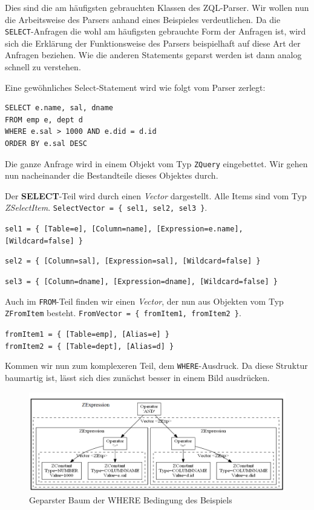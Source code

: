 Dies sind die am häufigsten gebrauchten Klassen des ZQL-Parser. Wir wollen nun die Arbeitsweise des Parsers anhand eines Beispieles verdeutlichen. Da die \verb|SELECT|-Anfragen die wohl am häufigsten gebrauchte Form der Anfragen ist, wird sich die Erklärung der Funktionsweise des Parsers beispielhaft auf diese Art der Anfragen beziehen. Wie die anderen Statements geparst werden ist dann analog schnell zu verstehen.


Eine gewöhnliches Select-Statement wird wie folgt vom Parser zerlegt:
\begin{verbatim}
SELECT e.name, sal, dname 
FROM emp e, dept d 
WHERE e.sal > 1000 AND e.did = d.id 
ORDER BY e.sal DESC\end{verbatim}

Die ganze Anfrage wird in einem Objekt vom Typ \verb|ZQuery| eingebettet. Wir gehen nun nacheinander die Bestandteile dieses Objektes durch. 

Der \textbf{SELECT}-Teil wird durch einen \textit{Vector} dargestellt. Alle Items sind vom Typ \textit{ZSelectItem}. \verb|SelectVector = { sel1, sel2, sel3 }|.

\verb|sel1 = { [Table=e], [Column=name], [Expression=e.name], [Wildcard=false] }|

\verb|sel2 = { [Column=sal], [Expression=sal], [Wildcard=false] }|

\verb|sel3 = { [Column=dname], [Expression=dname], [Wildcard=false] }|

Auch im \verb|FROM|-Teil finden wir einen \textit{Vector}, der nun aus Objekten vom Typ \verb|ZFromItem| besteht. \verb|FromVector = { fromItem1, fromItem2 }|.

\verb|fromItem1 = { [Table=emp], [Alias=e] }|\\
\verb|fromItem2 = { [Table=dept], [Alias=d] }|

Kommen wir nun zum komplexeren Teil, dem \verb|WHERE|-Ausdruck. Da diese Struktur baumartig ist, lässt sich dies zunächst besser in einem Bild ausdrücken.

\begin{figure}[H]
\centering
\includegraphics[scale=0.49]{Bilder/where_teil.png}
\caption{Geparster Baum der WHERE Bedingung des Beispiels}
\label{fig:parseTree}
\end{figure}

